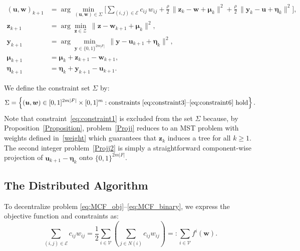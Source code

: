 \documentclass[11pt,a4paper]{article}
\theoremstyle{plain}
\theoremstyle{definition}
\theoremstyle{remark}
\begin{document}
	\begin{subequations}
		\begin{align}
			(\boldsymbol{u}, \boldsymbol{w})_{k+1}
			&= \arg\min_{(\boldsymbol{u}, \boldsymbol{w}) \in \Sigma}
			\Big[
			\sum_{(i,j)\in\mathcal{E}} c_{ij}\, w_{ij}
			+ \tfrac{\rho}{2}\,\|\boldsymbol{z}_k - \boldsymbol{w} + \boldsymbol{\mu}_k\|^2
			+ \tfrac{\rho}{2}\,\|\boldsymbol{y}_k - \boldsymbol{u} + \boldsymbol{\eta}_k\|^2
			\Big],\label{cent-start}\\
			\boldsymbol{z}_{k+1}
			&= \arg\min_{\boldsymbol{z}\in\mathcal{Z}}
			\ \|\boldsymbol{z} - \boldsymbol{w}_{k+1} + \boldsymbol{\mu}_k\|^2, \label{Projj}\\
			\boldsymbol{y}_{k+1}
			&= \arg\min_{\boldsymbol{y}\in \{0,1\}^{2m|F|}}
			\ \|\boldsymbol{y} - \boldsymbol{u}_{k+1} + \boldsymbol{\eta}_k\|^2,\label{Projj2}\\
			\boldsymbol{\mu}_{k+1} &= \boldsymbol{\mu}_k + \boldsymbol{z}_{k+1} - \boldsymbol{w}_{k+1},\\
			\boldsymbol{\eta}_{k+1} &= \boldsymbol{\eta}_k + \boldsymbol{y}_{k+1} - \boldsymbol{u}_{k+1}.\label{cent-end}
		\end{align}
	\end{subequations}
	
	We define the constraint set \( \Sigma \) by:
	\[
	\Sigma = \left\{ (\boldsymbol{u}, \boldsymbol{w}) \in [0,1]^{2m|F|}\times[0,1]^m  : \text{constraints~\eqref{eq:constraint3}--\eqref{eq:constraint6} hold} \right\}.
	\]
	Note that constraint~\eqref{eq:constraint1} is excluded from the set $\Sigma$ 
	because, by Proposition~\ref{Proposition}, problem~\eqref{Projj} reduces to an MST problem with weights defined in~\eqref{weight} which guarantees that $\boldsymbol{z}_k$ induces a tree for all $k\geq1$. The second integer problem~\eqref{Projj2} is simply a straightforward component-wise 
	projection of $\boldsymbol{u}_{k+1} - \boldsymbol{\eta}_k$ onto 
	$\{0,1\}^{2m|F|}$.
	
	
	
	\subsection{The Distributed Algorithm}
	To decentralize problem \eqref{eq:MCF_obj}--\eqref{eq:MCF_binary}, we express the objective function and constraints as:
	\begin{equation}
		\sum_{(i,j) \in \mathcal{E}} c_{ij} w_{ij}
		= \frac{1}{2} \sum_{i \in \mathcal{V}} \left( \sum_{j \in N(i)} c_{ij} w_{ij} \right)
		=: \sum_{i \in \mathcal{V}} f^i(\boldsymbol{w}).
		\label{Q1}
	\end{equation}
	
\end{document}
